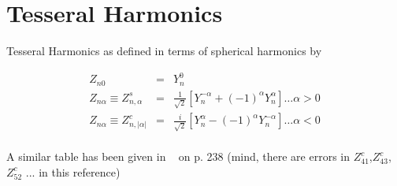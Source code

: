 \section{Tesseral Harmonics}\label{tesseral}

Tesseral Harmonics as defined in terms of spherical harmonics by

\begin{eqnarray}
Z_{n0}&=&Y_n^0 \\
Z_{n\alpha}\equiv Z_{n,\alpha}^s&=&\frac{1}{\sqrt{2}}[Y_n^{-\alpha}+(-1)^{\alpha}Y_n^{\alpha}] \dots \alpha>0 \\
Z_{n\alpha}\equiv Z_{n,|\alpha|}^c&=&\frac{i}{\sqrt{2}}[Y_n^{\alpha}-(-1)^{\alpha}Y_n^{-\alpha}] \dots \alpha<0 \\
\end{eqnarray}

A similar table has been given in ~\cite{goerrler96-121} on p. 238 (mind, there are errors in $Z^c_{41}$,$Z^c_{43}$,$Z^c_{52}$ %
... in this reference)


